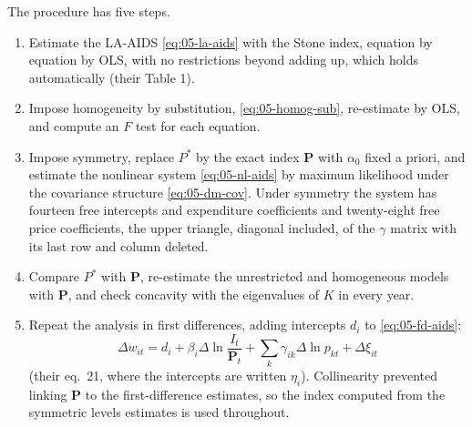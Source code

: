The procedure has five steps.
\begin{enumerate}[label=\arabic*.]
  \item Estimate the LA-AIDS \eqref{eq:05-la-aids} with the Stone index, equation by equation by OLS,
  with no restrictions beyond adding up, which holds automatically (their Table 1).
  \item Impose homogeneity by substitution, \eqref{eq:05-homog-sub}, re-estimate by OLS, and compute an
  $F$ test for each equation.
  \item Impose symmetry, replace $P^*$ by the exact index $\mathbf{P}$ with $\alpha_0$ fixed a priori, and
  estimate the nonlinear system \eqref{eq:05-nl-aids} by maximum likelihood under the covariance structure
  \eqref{eq:05-dm-cov}. Under symmetry the system has fourteen free intercepts and expenditure
  coefficients and twenty-eight free price coefficients, the upper triangle, diagonal included, of the
  $\gamma$ matrix with its last row and column deleted.
  \item Compare $P^*$ with $\mathbf{P}$, re-estimate the unrestricted and homogeneous models with
  $\mathbf{P}$, and check concavity with the eigenvalues of $K$ in every year.
  \item Repeat the analysis in first differences, adding intercepts $d_i$ to \eqref{eq:05-fd-aids}:
  \begin{equation}\label{eq:05-dm-fd}
    \Delta w_{it} = d_i + \beta_i\Delta\ln\frac{I_t}{\mathbf{P}_t} + \sum_k\gamma_{ik}\Delta\ln p_{kt}
    + \Delta\xi_{it}
  \end{equation}
  (their eq.~21, where the intercepts are written $\eta_i$). Collinearity prevented linking $\mathbf{P}$
  to the first-difference estimates, so the index computed from the symmetric levels estimates is used
  throughout.
\end{enumerate}


